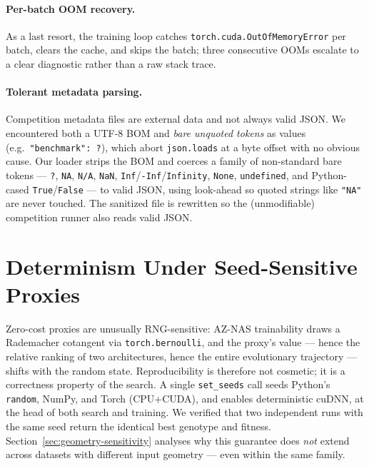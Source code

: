 \documentclass[10pt,twocolumn]{article}
\newcommand{\code}[1]{\texttt{\small #1}}
\begin{document}
\paragraph{Per-batch OOM recovery.}
As a last resort, the training loop catches
\code{torch.cuda.OutOfMemoryError} per batch, clears the cache, and skips the
batch; three consecutive OOMs escalate to a clear diagnostic rather than a raw
stack trace.

\paragraph{Tolerant metadata parsing.}
Competition metadata files are external data and not always valid JSON.
We encountered both a UTF-8 BOM and \emph{bare unquoted tokens} as values
(e.g.\ \code{"benchmark": ?}), which abort \code{json.loads} at a byte offset
with no obvious cause. Our loader strips the BOM and coerces a family of
non-standard bare tokens --- \code{?}, \code{NA}, \code{N/A}, \code{NaN},
\code{Inf}/\code{-Inf}/\code{Infinity}, \code{None}, \code{undefined}, and
Python-cased \code{True}/\code{False} --- to valid JSON, using look-ahead so
quoted strings like \code{"NA"} are never touched. The sanitized file is
rewritten so the (unmodifiable) competition runner also reads valid JSON.

\section{Determinism Under Seed-Sensitive Proxies}
\label{sec:reproducibility}

Zero-cost proxies are unusually RNG-sensitive: AZ-NAS trainability draws a
Rademacher cotangent via \code{torch.bernoulli}, and the proxy's value ---
hence the relative ranking of two architectures, hence the entire evolutionary
trajectory --- shifts with the random state. Reproducibility is therefore not
cosmetic; it is a correctness property of the search. A single
\code{set\_seeds} call seeds Python's \code{random}, NumPy, and Torch
(CPU+CUDA), and enables deterministic cuDNN, at the head of both search and
training. We verified that two independent runs with the same seed return the
identical best genotype and fitness.
Section~\ref{sec:geometry-sensitivity} analyses why this guarantee does
\emph{not} extend across datasets with different input geometry --- even within
the same family.
\end{document}
